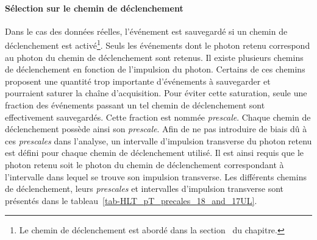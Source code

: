 \paragraph{Sélection sur le chemin de déclenchement}
Dans le cas des données réelles, l'événement est sauvegardé si un chemin de déclenchement est activé\footnote{Le chemin de déclenchement est abordé dans la section~ du chapitre.}.
Seuls les événements dont le photon retenu correspond au photon du chemin de déclenchement sont retenus.
Il existe plusieurs chemins de déclenchement en fonction de l'impulsion du photon.
Certains de ces chemins proposent une quantité trop importante d'événements à sauvegarder et pourraient saturer la chaîne d'acquisition.
Pour éviter cette saturation, seule une fraction des événements passant un tel chemin de déclenchement sont effectivement sauvegardés.
Cette fraction est nommée \emph{prescale}.
Chaque chemin de déclenchement possède ainsi son \emph{prescale}.
Afin de ne pas introduire de biais dû à ces \emph{prescales} dans l'analyse, un intervalle d'impulsion transverse du photon retenu est défini pour chaque chemin de déclenchement utilisé.
Il est ainsi requis que le photon retenu soit le photon du chemin de déclenchement correspondant à l'intervalle dans lequel se trouve son impulsion transverse.
Les différents chemins de déclenchement, leurs \emph{prescales} et intervalles d'impulsion transverse sont présentés dans le tableau~\ref{tab-HLT_pT_precales_18_and_17UL}.
